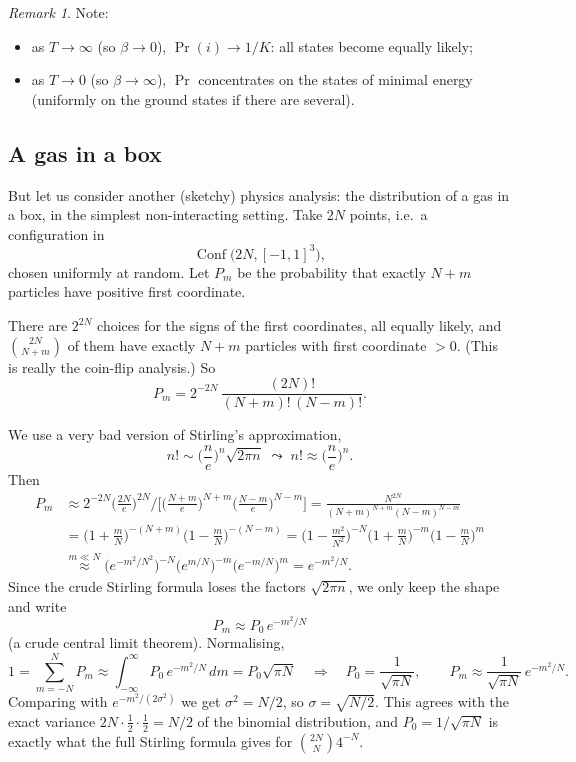 \documentclass[11pt,openany]{book}
\theoremstyle{plain}
\theoremstyle{definition}
\theoremstyle{remark}
\newtheorem{remark}[theorem]{Remark}
\newcommand{\added}[1]{{\color{addcol}#1}}
\newcommand{\Conf}{\operatorname{Conf}}
\begin{document}
\begin{remark}
Note:
\begin{itemize}
  \item as $T\to\infty$ (so $\beta\to0$), $\Pr(i)\to 1/K$: all states become equally likely;
  \item as $T\to 0$ (so $\beta\to\infty$), $\Pr$ concentrates on the states of minimal
    energy \added{(uniformly on the ground states if there are several)}.
\end{itemize}
\end{remark}

\subsection{A gas in a box}
\label{L07:subsec:gas}

But let us consider another (sketchy) physics analysis: the distribution of a gas in a box,
in the simplest non-interacting setting. Take $2N$ points, i.e.\ a configuration in
\[
  \Conf\big(2N,[-1,1]^3\big),
\]
\added{chosen uniformly at random.} Let $P_m$ be the probability that exactly $N+m$
particles have positive first coordinate.

There are $2^{2N}$ choices for the signs of the first coordinates, all equally likely, and
$\binom{2N}{N+m}$ of them have exactly $N+m$ particles with first coordinate $>0$. (This is
really the coin-flip analysis.) So
\[
  P_m=2^{-2N}\,\frac{(2N)!}{(N+m)!\,(N-m)!}.
\]

We use a very bad version of Stirling's approximation,
\[
  n!\sim\Big(\frac ne\Big)^n\sqrt{2\pi n}\;\leadsto\;n!\approx\Big(\frac ne\Big)^n .
\]
Then
\begin{align*}
  P_m&\approx 2^{-2N}\Big(\frac{2N}{e}\Big)^{2N}\Big/
     \Big[\Big(\frac{N+m}{e}\Big)^{N+m}\Big(\frac{N-m}{e}\Big)^{N-m}\Big]
   =\frac{N^{2N}}{(N+m)^{N+m}(N-m)^{N-m}}\\
  &=\Big(1+\frac mN\Big)^{-(N+m)}\Big(1-\frac mN\Big)^{-(N-m)}
   =\Big(1-\frac{m^2}{N^2}\Big)^{-N}\Big(1+\frac mN\Big)^{-m}\Big(1-\frac mN\Big)^{m}\\
  &\overset{m\ll N}{\approx}\big(e^{-m^2/N^2}\big)^{-N}\big(e^{m/N}\big)^{-m}\big(e^{-m/N}\big)^{m}
   = e^{-m^2/N}.
\end{align*}
Since the crude Stirling formula loses the factors $\sqrt{2\pi n}$, we only keep the shape
and write
\[
  P_m\approx P_0\,e^{-m^2/N}
\]
(a crude central limit theorem). Normalising,
\[
  1=\sum_{m=-N}^{N}P_m\approx\int_{-\infty}^{\infty}P_0\,e^{-m^2/N}\,dm=P_0\sqrt{\pi N}
  \quad\Longrightarrow\quad
  P_0=\frac{1}{\sqrt{\pi N}},\qquad P_m\approx\frac{1}{\sqrt{\pi N}}\,e^{-m^2/N}.
\]
Comparing with $e^{-m^2/(2\sigma^2)}$ we get $\sigma^2=N/2$, so $\sigma=\sqrt{N/2}$.
\added{This agrees with the exact variance $2N\cdot\frac12\cdot\frac12=N/2$ of the
binomial distribution, and $P_0=1/\sqrt{\pi N}$ is exactly what the full Stirling formula
gives for $\binom{2N}{N}4^{-N}$.}
\end{document}
